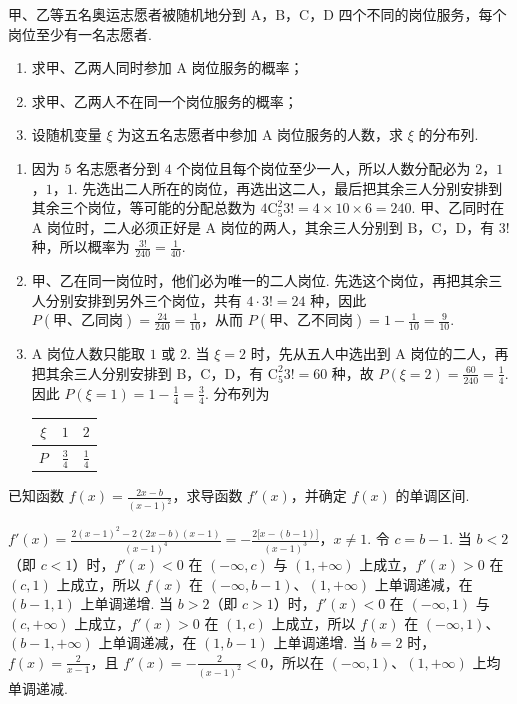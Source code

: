 \begin{problem}
甲、乙等五名奥运志愿者被随机地分到 A，B，C，D 四个不同的岗位服务，每个岗位至少有一名志愿者.

\begin{enumerate}
\item 求甲、乙两人同时参加 A 岗位服务的概率；
\item 求甲、乙两人不在同一个岗位服务的概率；
\item 设随机变量 \( \xi \) 为这五名志愿者中参加 A 岗位服务的人数，求 \( \xi \) 的分布列.
\end{enumerate}

\begin{solution}
\begin{enumerate}
\item 因为 \(5\) 名志愿者分到 \(4\) 个岗位且每个岗位至少一人，所以人数分配必为 \(2\)，\(1\)，\(1\)，\(1\). 先选出二人所在的岗位，再选出这二人，最后把其余三人分别安排到其余三个岗位，等可能的分配总数为 \(4\mathrm C_5^2 3!=4\times10\times6=240\). 甲、乙同时在 A 岗位时，二人必须正好是 A 岗位的两人，其余三人分别到 B，C，D，有 \(3!\) 种，所以概率为 \(\frac{3!}{240}=\frac1{40}\).
\item 甲、乙在同一岗位时，他们必为唯一的二人岗位. 先选这个岗位，再把其余三人分别安排到另外三个岗位，共有 \(4\cdot3!=24\) 种，因此 \(P(\text{甲、乙同岗})=\frac{24}{240}=\frac1{10}\)，从而 \(P(\text{甲、乙不同岗})=1-\frac1{10}=\frac9{10}\).
\item A 岗位人数只能取 \(1\) 或 \(2\). 当 \(\xi=2\) 时，先从五人中选出到 A 岗位的二人，再把其余三人分别安排到 B，C，D，有 \(\mathrm C_5^2 3!=60\) 种，故 \(P(\xi=2)=\frac{60}{240}=\frac14\). 因此 \(P(\xi=1)=1-\frac14=\frac34\). 分布列为
\begin{center}
\begin{tabular}{c|cc}
\(\xi\)&\(1\)&\(2\)\\ \hline
\(P\)&\(\frac34\)&\(\frac14\)
\end{tabular}
\end{center}
\end{enumerate}
\end{solution}
\end{problem}

\begin{problem}
已知函数 \( f(x) = \frac{2x - b}{(x - 1)^2} \)，求导函数 \( f'(x) \)，并确定 \( f(x) \) 的单调区间.

\begin{solution}
\(f'(x)=\frac{2(x-1)^2-2(2x-b)(x-1)}{(x-1)^4}=-\frac{2\bigl[x-(b-1)\bigr]}{(x-1)^3}\)，\(x\ne1\).
令 \(c=b-1\). 当 \(b<2\)（即 \(c<1\)）时，\(f'(x)<0\) 在 \((-\infty,c)\) 与 \((1,+\infty)\) 上成立，\(f'(x)>0\) 在 \((c,1)\) 上成立，所以 \(f(x)\) 在 \((-\infty,b-1)\)、\((1,+\infty)\) 上单调递减，在 \((b-1,1)\) 上单调递增. 当 \(b>2\)（即 \(c>1\)）时，\(f'(x)<0\) 在 \((-\infty,1)\) 与 \((c,+\infty)\) 上成立，\(f'(x)>0\) 在 \((1,c)\) 上成立，所以 \(f(x)\) 在 \((-\infty,1)\)、\((b-1,+\infty)\) 上单调递减，在 \((1,b-1)\) 上单调递增. 当 \(b=2\) 时，\(f(x)=\frac2{x-1}\)，且 \(f'(x)=-\frac2{(x-1)^2}<0\)，所以在 \((-\infty,1)\)、\((1,+\infty)\) 上均单调递减.
\end{solution}
\end{problem}

